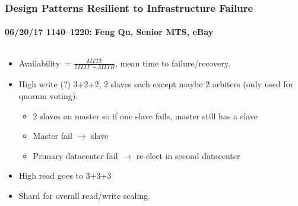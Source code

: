 \documentclass[xcolor=dvipsnames, 9pt]{beamer}
\begin{document}
\begin{frame}
    \frametitle{Design Patterns Resilient to Infrastructure Failure}
    \framesubtitle{%
        06/20/17 1140--1220:
        Feng Qu, Senior MTS, eBay
    }
    \begin{columns}
        \begin{column}{0.5\textwidth}
            \begin{itemize}
                \item Availability $=\frac{MTTF}{MTTF + MTTR}$, mean time to
                    failure/recovery.
                \item High write (?) 3+2+2, 2 slaves each except maybe 2
                    arbiters (only used for quorum voting).
                    \begin{itemize}
                        \item 2 slaves on master so if one slave fails, master
                            still has a slave
                        \item Master fail $\to$ slave
                        \item Primary datacenter fail $\to$ re-elect in second
                            datacenter
                    \end{itemize}
                \item High read goes to 3+3+3
                \item Shard for overall read/write scaling.
            \end{itemize}
        \end{column}

\end{columns}
\end{frame}
\end{document}
